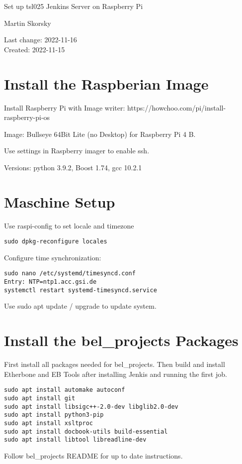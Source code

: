 \documentclass[12pt,a4paper]{report}
\begin{document}
\begin{titlepage}
\vspace{2cm}
\begin{center}
\Huge{Set up tsl025 Jenkins Server on Raspberry Pi}

\Large{Martin Skorsky}

\Large{Last change: 2022-11-16 \\ Created: 2022-11-15}
\end{center}
\vfill
\end{titlepage}

\tableofcontents

\chapter{Install the Raspberian Image}
Install Raspberry Pi with Image writer:
https://howchoo.com/pi/install-raspberry-pi-os

Image: Bullseye 64Bit Lite (no Desktop) for Raspberry Pi 4 B.

Use settings in Raspberry imager to enable ssh.

Versions: python 3.9.2, Boost 1.74, gcc 10.2.1

\chapter{Maschine Setup}
Use raspi-config to set locale and timezone
\begin{verbatim}
sudo dpkg-reconfigure locales
\end{verbatim}

Configure time synchronization:
\begin{verbatim}
sudo nano /etc/systemd/timesyncd.conf
Entry: NTP=ntp1.acc.gsi.de
systemctl restart systemd-timesyncd.service
\end{verbatim}
Use sudo apt update / upgrade to update system.

\chapter{Install the bel\_projects Packages}
First install all packages needed for bel\_projects. Then build and install
Etherbone and EB Tools after installing Jenkis and running the first job.
\begin{verbatim}
sudo apt install automake autoconf
sudo apt install git
sudo apt install libsigc++-2.0-dev libglib2.0-dev
sudo apt install python3-pip
sudo apt install xsltproc
sudo apt install docbook-utils build-essential
sudo apt install libtool libreadline-dev
\end{verbatim}
Follow bel\_projects README for up to date instructions.
\end{document}
